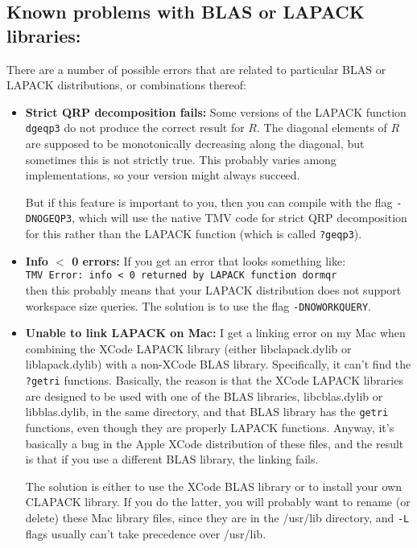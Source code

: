 \documentclass[twoside,letterpaper,11pt]{article}
\renewcommand{\tt}[1]{{\lstinline {#1}}}
\begin{document}
\subsection{Known problems with BLAS or LAPACK libraries:}
There are a number of possible errors that are related to particular BLAS or LAPACK
distributions, or combinations thereof:
\begin{itemize}

\item{\bf Strict QRP decomposition fails:}
Some versions of the LAPACK function \tt{dgeqp3} do not produce the correct
result for $R$.  The diagonal elements of $R$ are supposed to be monotonically decreasing
along the diagonal, but sometimes this is not strictly true.  This probably varies among
implementations, so your version might always succeed.

But if this feature is important to you, then you can compile with the flag \texttt{-DNOGEQP3},
which will use the native TMV code for strict QRP decomposition for this 
rather than the LAPACK function (which is called \tt{?geqp3}).

\item{\bf Info $<$ 0 errors:}
If you get an error that looks something like:\\
\texttt{TMV Error: info < 0 returned by LAPACK function dormqr}\\
then this probably means that your LAPACK distribution does not support
workspace size queries.  The solution is to use the flag \texttt{-DNOWORKQUERY}.

\item {\bf Unable to link LAPACK on Mac:}
I get a linking error on my Mac when combining the XCode LAPACK library
(either libclapack.dylib or liblapack.dylib) with a non-XCode BLAS library.
Specifically, it can't find the \texttt{?getri} functions.   Basically, the reason is that
the XCode LAPACK libraries are designed to be used with one of the BLAS
libraries, libcblas.dylib or libblas.dylib, in the same directory, 
and that BLAS library has the \texttt{getri}
functions, even though they are properly LAPACK functions.
Anyway, it's basically a bug in the Apple XCode distribution of these files,
and the result is that if you use a different BLAS library, the linking fails.

The solution is either to use the XCode BLAS library or to install your own CLAPACK
library.  If you do the latter, you will probably want to rename (or delete) these Mac
library files, since they are in the /usr/lib directory, and \tt{-L} flags usually can't take 
precedence over /usr/lib.


\end{itemize}
\end{document}
